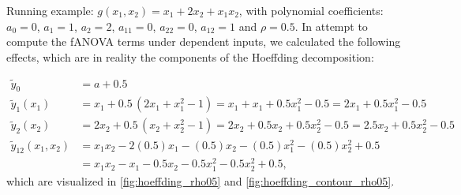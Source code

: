 Running example: $g(x_1, x_2) = x_1 + 2 x_2 + x_1 x_2$, with polynomial coefficients: $a_0 = 0$, $a_1 = 1$, $a_2 = 2$, $a_{11} = 0$, $a_{22} = 0$, $a_{12} = 1$ and $\rho = 0.5$.
In attempt to compute the fANOVA terms under dependent inputs, we calculated the following effects, which are in reality the components of the Hoeffding decomposition:

\begin{align*}
\tilde{y}_0 &= a + 0.5 \\[3pt]
\tilde{y}_1(x_1) &= x_1 + 0.5\,(2x_1 + x_1^2 - 1)
= x_1 + x_1 + 0.5x_1^2 - 0.5
= 2x_1 + 0.5x_1^2 - 0.5 \\[3pt]
\tilde{y}_2(x_2) &= 2x_2 + 0.5\,(x_2 + x_2^2 - 1)
= 2x_2 + 0.5x_2 + 0.5x_2^2 - 0.5
= 2.5x_2 + 0.5x_2^2 - 0.5 \\[3pt]
\tilde{y}_{12}(x_1,x_2) &= x_1x_2 - 2(0.5)x_1 - (0.5)x_2 - (0.5)x_1^2 - (0.5)x_2^2 + 0.5 \\[3pt]
&= x_1x_2 - x_1 - 0.5x_2 - 0.5x_1^2 - 0.5x_2^2 + 0.5,
\end{align*}
which are visualized in \autoref{fig:hoeffding_rho05} and \autoref{fig:hoeffding_contour_rho05}.

